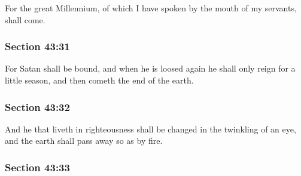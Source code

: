 		For the great Millennium, of which I have spoken by the mouth of my servants, shall come.


	\subsubsection{Section 43:31} %
		\label{DC43-31}

		For Satan shall be bound, and when he is loosed again he shall only reign for a little season, and then cometh the end of the earth.


	\subsubsection{Section 43:32} %
		\label{DC43-32}

		And he that liveth in righteousness shall be changed in the twinkling of an eye, and the earth shall pass away so as by fire.


	\subsubsection{Section 43:33} %
		\label{DC43-33}

